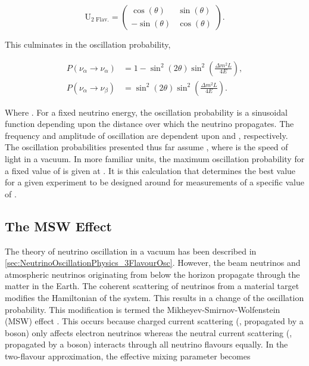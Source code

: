 \begin{equation}
  \label{eq:NeutrinoOscillationPhysics_PMNS_2Flavour}
  \mathrm{U_{\text{2 Flav.}}} = \begin{pmatrix} \cos(\theta) & \sin(\theta) \\ -\sin(\theta) & \cos(\theta) \end{pmatrix}.
\end{equation}

This culminates in the oscillation probability,

\begin{equation}
  \label{eq:NeutrinoOscillationPhysics_PMNS_2FlavourOscProb}
  \begin{split}
  P(\nu_{\alpha} \rightarrow \nu_{\alpha}) &= 1 - \sin^{2} \left( 2\theta \right) \sin^2 \left( \frac{\Delta m^{2} L}{4E} \right), \\
  P(\nu_{\alpha} \rightarrow \nu_{\beta}) &= \sin^{2} \left( 2\theta \right) \sin^2 \left( \frac{\Delta m^{2} L}{4E} \right).
  \end{split}
\end{equation}

Where \quickmath{\alpha \neq \beta}. For a fixed neutrino energy, the oscillation probability is a sinusoidal function depending upon the distance over which the neutrino propagates. The frequency and amplitude of oscillation are dependent upon  and , respectively. The oscillation probabilities presented thus far assume , where  is the speed of light in a vacuum. In more familiar units, the maximum oscillation probability for a fixed value of \quickmath{\theta} is given at . It is this calculation that determines the best  value for a given experiment to be designed around for measurements of a specific value of .

\subsection{The MSW Effect}
\label{sec:NeutrinoOscillationPhysics_MSW}

The theory of neutrino oscillation in a vacuum has been described in \autoref{sec:NeutrinoOscillationPhysics_3FlavourOsc}. However, the beam neutrinos and atmospheric neutrinos originating from below the horizon propagate through the matter in the Earth. The coherent scattering of neutrinos from a material target modifies the Hamiltonian of the system. This results in a change of the oscillation probability. This modification is termed the Mikheyev-Smirnov-Wolfenstein (MSW) effect \cite{Smirnov2003-yb, msw, wolfenstein}. This occurs because charged current scattering (, propagated by a  boson) only affects electron neutrinos whereas the neutral current scattering (, propagated by a  boson) interacts through all neutrino flavours equally. In the two-flavour approximation, the effective mixing parameter becomes

